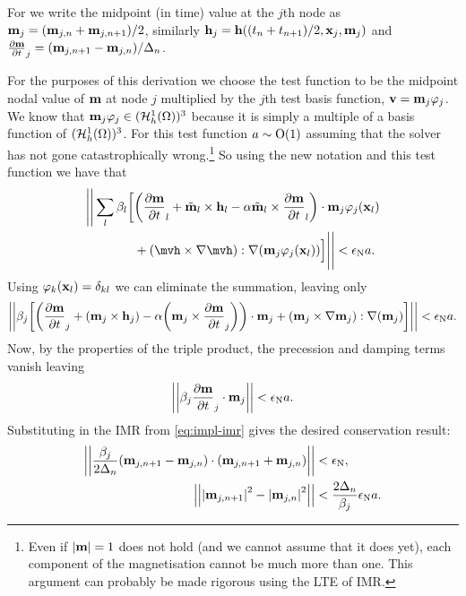 For  we write the midpoint (in time) value at the $j$th node as $\boldsymbol{\mathrm{m}}_j = (\boldsymbol{\mathrm{m}}_{j,n} + \boldsymbol{\mathrm{m}}_{j,n+1})/2$,  similarly $\boldsymbol{\mathrm{h}}_j = \boldsymbol{\mathrm{h}}((t_n+t_{n+1})/2, \boldsymbol{\mathrm{x}}_j, \boldsymbol{\mathrm{m}}_j)$ and $\frac{\partial \boldsymbol{\mathrm{m}}}{\partial t}_j = (\boldsymbol{\mathrm{m}}_{j,n+1} - \boldsymbol{\mathrm{m}}_{j,n})/\Delta_{n}$.

For the purposes of this derivation we choose the test function to be the midpoint nodal value of $\boldsymbol{\mathrm{m}}$ at node $j$ multiplied by the $j$th test basis function, \ie $\boldsymbol{\mathrm{v}} = \boldsymbol{\mathrm{m}}_{j} \varphi_j$.
We know that $\boldsymbol{\mathrm{m}}_{j}\varphi_j \in  ({\mathcal{H}^1_h(\Omega)})^3$ because it is simply a multiple of a basis function of $({\mathcal{H}^1_h(\Omega)})^3$.
For this test function $a \sim \mathrm{O}{\left( 1 \right)}$ assuming that the solver has not gone catastrophically wrong.\footnote{Even if $\left|{\boldsymbol{\mathrm{m}}} \right|=1$ does not hold (and we cannot assume that it does yet), each component of the magnetisation cannot be much more than one. This argument can probably be made rigorous using the LTE of IMR.}
So using the new notation and this test function we have that
\begin{equation}
  \begin{aligned}
    \Bigg|\Bigg| \sum_l \beta_l \bigg[& \bigb{\dmdt_l + \mvdis_l \times \hv_l - \dampc \mvdis_l \times \dmdt_l} \cdot \mv_{j}\tbf_j(\xv_l) \\
    &+ \bigb{\mvh \times \grad \mvh} : \grad (\mv_{j}\tbf_j(\xv_l)) \Big] \Bigg|\Bigg| < \ntol \sumbasiscoeff.
  \end{aligned}
\end{equation}
Using $\varphi_k(\boldsymbol{\mathrm{x}}_l) = \delta_{kl}$ we can eliminate the summation, leaving only
\begin{equation}
  \begin{aligned}
    \left| \left| \beta_j \bigg[ {\left( \frac{\partial \boldsymbol{\mathrm{m}}}{\partial t}_j  + (\boldsymbol{\mathrm{m}}_{j} \times \boldsymbol{\mathrm{h}}_{j})  - \alpha {\left( \boldsymbol{\mathrm{m}}_{j} \times \frac{\partial \boldsymbol{\mathrm{m}}}{\partial t}_j \right)} \right)} \cdot \boldsymbol{\mathrm{m}}_{j}
    + {\left( \boldsymbol{\mathrm{m}}_j \times \nabla \boldsymbol{\mathrm{m}}_j \right)} : \nabla (\boldsymbol{\mathrm{m}}_{j})
    \bigg]  \right| \right| < \epsilon_{\mathrm{N}} a.
  \end{aligned}
\end{equation}
Now, by the properties of the triple product, the precession and damping terms vanish leaving
\begin{equation}
  \left| \left| \beta_j \frac{\partial \boldsymbol{\mathrm{m}}}{\partial t}_j \cdot  \boldsymbol{\mathrm{m}}_{j}  \right| \right| < \epsilon_{\mathrm{N}} a.
\end{equation}
Substituting in the IMR from \cref{eq:impl-imr} gives the desired conservation result:
\begin{equation}
  \begin{aligned}
    \left| \left| \frac{\beta_j}{2\Delta_{n}}(\boldsymbol{\mathrm{m}}_{j,n+1} - \boldsymbol{\mathrm{m}}_{j,n}) \cdot (\boldsymbol{\mathrm{m}}_{j, n+1} + \boldsymbol{\mathrm{m}}_{j, n}) \right| \right| &< \epsilon_{\mathrm{N}}, \\
    \left| \left| \left|{\boldsymbol{\mathrm{m}}_{j, n+1}} \right|^2 - \left|{\boldsymbol{\mathrm{m}}_{j, n}} \right|^2 \right| \right| &< \frac{2\Delta_{n}}{\beta_j} \epsilon_{\mathrm{N}} a.
  \end{aligned}
\end{equation}

